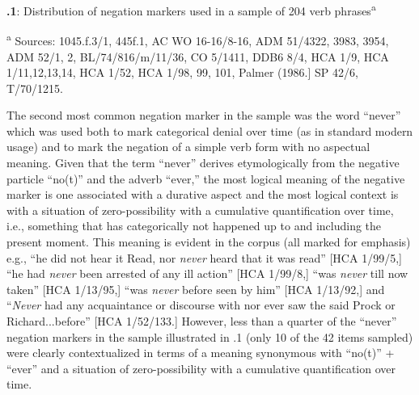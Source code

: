 \textbf{.1}: Distribution of negation markers used in a sample of 204 verb phrases\textsuperscript{a} 

\textsuperscript{a} Sources: 1045.f.3/1, 445f.1, AC WO 16-16/8-16, ADM 51/4322, 3983, 3954, ADM 52/1, 2, BL/74/816/m/11/36, CO 5/1411, DDB6 8/4, HCA 1/9, HCA 1/11,12,13,14, HCA 1/52, HCA 1/98, 99, 101, Palmer (1986.] SP 42/6, T/70/1215.

The second most common negation marker in the sample was the word “never” which was used both to mark categorical denial over time (as in standard modern usage) and to mark the negation of a simple verb form with no aspectual meaning. Given that the term “never” derives etymologically from the negative particle “no(t)” and the adverb “ever,” the most logical meaning of the negative marker is one associated with a durative aspect and the most logical context is with a situation of zero-possibility with a cumulative quantification over time, i.e., something that has categorically not happened up to and including the present moment. This meaning is evident in the corpus (all marked for emphasis) e.g., “he did not hear it Read, nor \textit{never} heard that it was read” [HCA 1/99/5,] “he had \textit{never} been arrested of any ill action” [HCA 1/99/8,] “was \textit{never} till now taken” [HCA 1/13/95,] “was \textit{never} before seen by him” [HCA 1/13/92,] and “\textit{Never} had any acquaintance or discourse with nor ever saw the said Prock or Richard...before” [HCA 1/52/133.] However, less than a quarter of the “never” negation markers in the sample illustrated in .1 (only 10 of the 42 items sampled) were clearly contextualized in terms of a meaning synonymous with “no(t)” + “ever” and a situation of zero-possibility with a cumulative quantification over time. 

